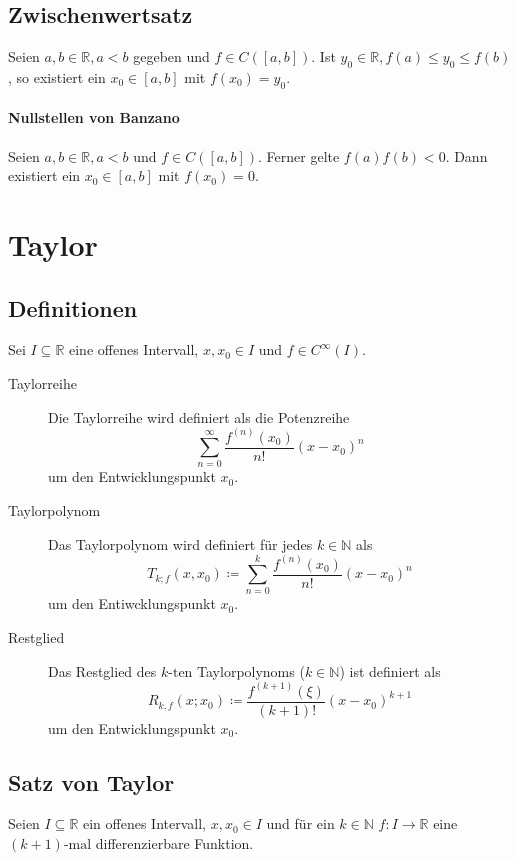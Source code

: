        \subsection{Zwischenwertsatz}
            Seien $ a, b \in \mathbb{R}, a < b $ gegeben und $ f \in C([a, b]) $. Ist $ y _ 0 \in \mathbb{R}, f(a) \leq y _ 0 \leq f(b) $, so existiert ein $ x _ 0 \in [a, b] $ mit $ f(x _ 0) = y _ 0 $.

            \paragraph{Nullstellen von Banzano}
                Seien $ a, b \in \mathbb{R}, a < b $ und $ f \in C([a, b]) $. Ferner gelte $ f(a)f(b) < 0 $. Dann existiert ein $ x _ 0 \in [a, b] $ mit $ f(x _ 0) = 0 $.

    \section{Taylor}
        \subsection{Definitionen}
            Sei $ I \subseteq \mathbb{R} $ eine offenes Intervall, $ x, x _ 0 \in I $ und $ f \in C ^ \infty (I) $.

            \begin{description}
                \item[Taylorreihe] Die Taylorreihe wird definiert als die Potenzreihe \[ \sum _ { n = 0 } ^ \infty \frac{f ^ {(n)} (x _ 0)}{n!} (x - x _ 0) ^ n \] um den Entwicklungspunkt $ x _ 0 $.
                \item[Taylorpolynom] Das Taylorpolynom wird definiert für jedes $ k \in \mathbb{N} $ als \[ T _ { k; f } (x, x _ 0) \coloneqq \sum _ { n = 0 } ^ k \frac{f ^ {(n)} (x _ 0)}{n!} (x - x _ 0) ^ n \] um den Entiwcklungspunkt $ x _ 0 $.
                \item[Restglied] Das Restglied des $ k\text{-ten} $ Taylorpolynoms ($ k \in \mathbb{N} $) ist definiert als \[ R _ { k, f } (x; x _ 0) \coloneqq \frac{f ^ {(k + 1)} (\xi)}{(k + 1)!} (x - x _ 0) ^ { k + 1 } \] um den Entwicklungspunkt $ x _ 0 $.
            \end{description}

        \subsection{Satz von Taylor}
            Seien $ I \subseteq \mathbb{R} $ ein offenes Intervall, $ x, x _ 0 \in I $ und für ein $ k \in \mathbb{N} $ $ f : I \rightarrow \mathbb{R} $ eine $ (k + 1)\text{-mal} $ differenzierbare Funktion.

